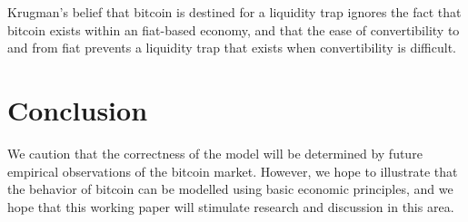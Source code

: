 \documentclass[12pt]{article}
\begin{document}
Krugman's belief that bitcoin is destined for a liquidity trap ignores
the fact that bitcoin exists within an fiat-based economy, and that
the ease of convertibility to and from fiat prevents a liquidity trap
that exists when convertibility is difficult.

\section{Conclusion}
We caution that the correctness of the model will be determined by
future empirical observations of the bitcoin market.  However, we hope
to illustrate that the behavior of bitcoin can be modelled using basic
economic principles, and we hope that this working paper will
stimulate research and discussion in this area.


\end{document}
